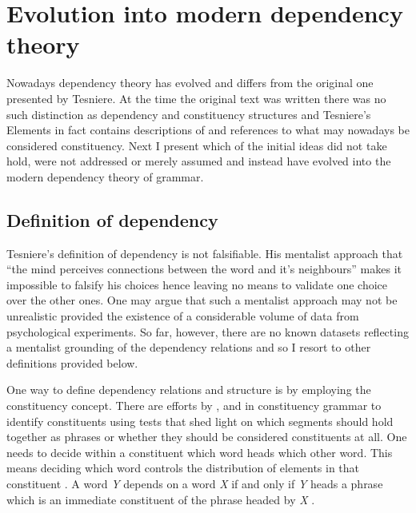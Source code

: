 

\section{Evolution into modern dependency theory}
    Nowadays dependency theory has evolved and differs from the original one presented by Tesniere. At the time the original text was written there was no such distinction as dependency and constituency structures and Tesniere's Elements \citep{Tesniere59} in fact contains descriptions of and references to what may nowadays be considered constituency. 
    Next I present which of the initial ideas did not take hold, were not addressed or merely assumed and instead have evolved into the modern dependency theory of grammar.

\subsection{Definition of dependency}
    Tesniere's definition of dependency is not falsifiable. His mentalist approach that ``the mind perceives connections between the word and it's neighbours'' \citep[3]{Tesniere2015} makes it impossible to falsify his choices hence leaving no means to validate one choice over the other ones. One may argue that such a mentalist approach may not be unrealistic provided the existence of a considerable volume of data from psychological experiments. So far, however, there are no known datasets reflecting a mentalist grounding of the dependency relations and so I resort to other definitions provided below.
    
    One way to define dependency relations and structure is by employing the constituency concept. There are efforts by \citet{Bloomfield33}, \citet{Hockett58} and \citet{harris1951methods} in constituency grammar to identify constituents using tests that shed light on which segments should hold together as phrases or whether they should be considered constituents at all. One needs to decide within a constituent which word heads which other word. This means deciding which word controls the distribution of elements in that constituent \citep{Bloomfield33,Zwicky85-heads}. A word \textit{Y} depends on a word \textit{X} if and only if \textit{Y} heads a phrase which is an immediate constituent of the phrase headed by \textit{X} \citep{Lecerf1961}. 

